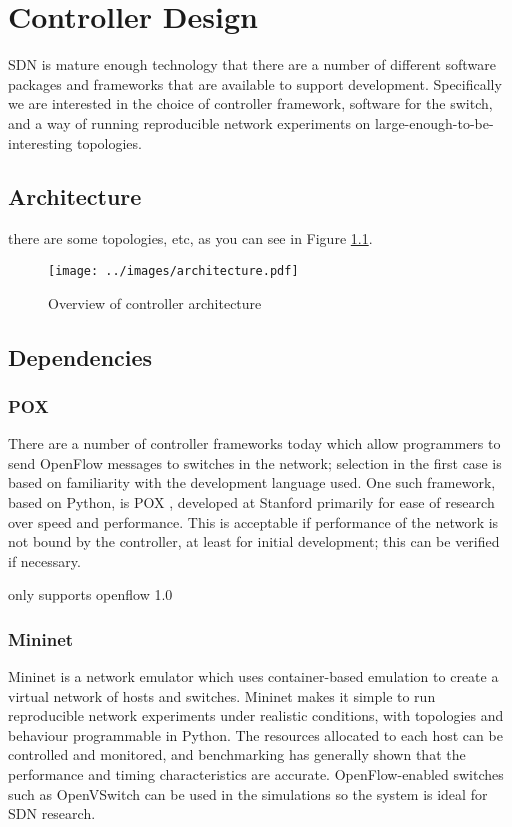 \chapter{Controller Design}

SDN is mature enough technology that there are a number of different software packages and frameworks that are available to support development. Specifically we are interested in the choice of controller framework, software for the switch, and a way of running reproducible network experiments on large-enough-to-be-interesting topologies.

\section{Architecture}
there are some topologies, etc, as you can see in Figure \ref{fig:arch}.

\begin{landscape}
\begin{figure}[h]
  \centering
  \texttt{[image: ../images/architecture.pdf]}
  \caption{Overview of controller architecture}
  \label{fig:arch}
\end{figure}
\end{landscape}

\section{Dependencies}
\subsection{POX}
There are a number of controller frameworks today which allow programmers to send OpenFlow messages to switches in the network; selection in the first case is based on familiarity with the development language used. One such framework, based on Python, is POX \cite{onl:pox}, developed at Stanford primarily for ease of research over speed and performance. This is acceptable if performance of the network is not bound by the controller, at least for initial development; this can be verified if necessary.

only supports openflow 1.0

\subsection{Mininet}
Mininet is a network emulator which uses container-based emulation \cite{handigol:mininet} to create a virtual network of hosts and switches. Mininet makes it simple to run reproducible network experiments under realistic conditions, with topologies and behaviour programmable in Python. The resources allocated to each host can be controlled and monitored, and benchmarking \cite{handigol:benchmarks} has generally shown that the performance and timing characteristics are accurate. OpenFlow-enabled switches such as OpenVSwitch can be used in the simulations so the system is ideal for SDN research.

